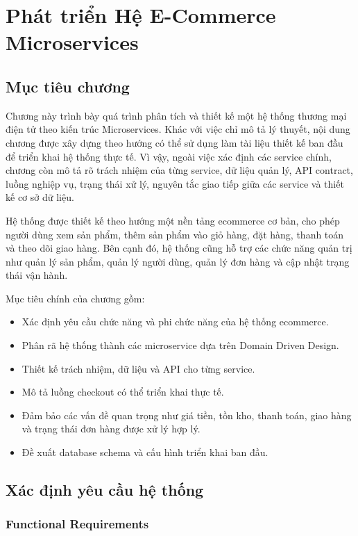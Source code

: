 \chapter{Phát triển Hệ E-Commerce Microservices}

\section{Mục tiêu chương}

Chương này trình bày quá trình phân tích và thiết kế một hệ thống thương mại điện tử theo kiến trúc Microservices. Khác với việc chỉ mô tả lý thuyết, nội dung chương được xây dựng theo hướng có thể sử dụng làm tài liệu thiết kế ban đầu để triển khai hệ thống thực tế. Vì vậy, ngoài việc xác định các service chính, chương còn mô tả rõ trách nhiệm của từng service, dữ liệu quản lý, API contract, luồng nghiệp vụ, trạng thái xử lý, nguyên tắc giao tiếp giữa các service và thiết kế cơ sở dữ liệu.

Hệ thống được thiết kế theo hướng một nền tảng ecommerce cơ bản, cho phép người dùng xem sản phẩm, thêm sản phẩm vào giỏ hàng, đặt hàng, thanh toán và theo dõi giao hàng. Bên cạnh đó, hệ thống cũng hỗ trợ các chức năng quản trị như quản lý sản phẩm, quản lý người dùng, quản lý đơn hàng và cập nhật trạng thái vận hành.

Mục tiêu chính của chương gồm:

\begin{itemize}
  \item Xác định yêu cầu chức năng và phi chức năng của hệ thống ecommerce.
  \item Phân rã hệ thống thành các microservice dựa trên Domain Driven Design.
  \item Thiết kế trách nhiệm, dữ liệu và API cho từng service.
  \item Mô tả luồng checkout có thể triển khai thực tế.
  \item Đảm bảo các vấn đề quan trọng như giá tiền, tồn kho, thanh toán, giao hàng và trạng thái đơn hàng được xử lý hợp lý.
  \item Đề xuất database schema và cấu hình triển khai ban đầu.
\end{itemize}

\section{Xác định yêu cầu hệ thống}

\subsection{Functional Requirements}

